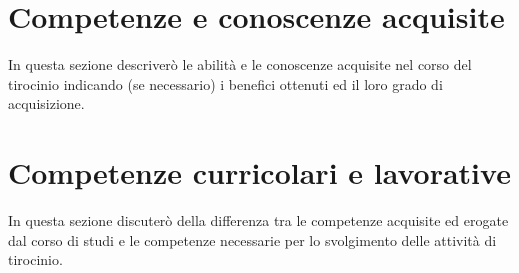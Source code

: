 \section{Competenze e conoscenze acquisite}

In questa sezione descriverò le abilità e le conoscenze acquisite nel corso del tirocinio indicando (se necessario) i benefici ottenuti ed il loro grado di acquisizione.

\section{Competenze curricolari e lavorative}

In questa sezione discuterò della differenza tra le competenze acquisite ed erogate dal corso di studi e le competenze necessarie per lo svolgimento delle attività di tirocinio.
